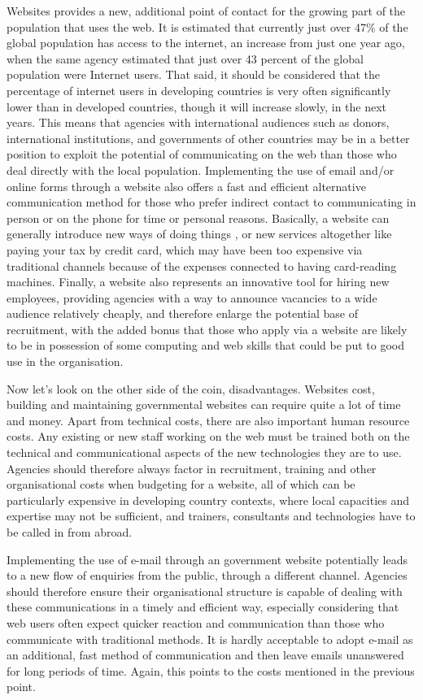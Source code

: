Websites provides a new, additional point of contact for the growing part of the population that uses the web. It is estimated that currently just over 47\% of the global population has access to the internet, an increase from just one year ago, when the same agency estimated that just over 43 percent of the global population were Internet users. That said, it should be considered that the percentage of internet users in developing countries is very often significantly lower than in developed countries, though it will increase slowly, in the next years. This means that agencies with international audiences such as donors, international institutions, and governments of other countries may be in a better position to exploit the potential of communicating on the web than those who deal directly with the local population. Implementing the use of email and/or online forms through a website also offers a fast and efficient alternative communication method for those who prefer indirect contact to communicating in person or on the phone for time or personal reasons. Basically, a website can generally introduce new ways of doing things , or new services altogether like paying your tax by credit card, which may have been too expensive via traditional channels because of the expenses connected to having card-reading machines. Finally, a website also represents an innovative tool for hiring new employees, providing agencies with a way to announce vacancies to a wide audience relatively cheaply, and therefore enlarge the potential base of recruitment, with the added bonus that those who apply via a website are likely to be in possession of some computing and web skills that could be put to good use in the organisation.

Now let’s look on the other side of the coin, disadvantages. Websites cost, building and maintaining governmental websites can require quite a lot of time and money. Apart from technical costs, there are also important human resource costs. Any existing or new staff working on the web must be trained both on the technical and communicational aspects of the new technologies they are to use. Agencies should therefore always factor in recruitment, training and other organisational costs when budgeting for a website, all of which can be particularly expensive in developing country contexts, where local capacities and expertise may not be sufficient, and trainers, consultants and technologies have to be called in from abroad.

Implementing the use of e-mail through an government website potentially leads to a new flow of enquiries from the public, through a different channel. Agencies should therefore ensure their organisational structure is capable of dealing with these communications in a timely and efficient way, especially considering that web users often expect quicker reaction and communication than those who communicate with traditional methods. It is hardly acceptable to adopt e-mail as an additional, fast method of communication and then leave emails unanswered for long periods of time. Again, this points to the costs mentioned in the previous point.


